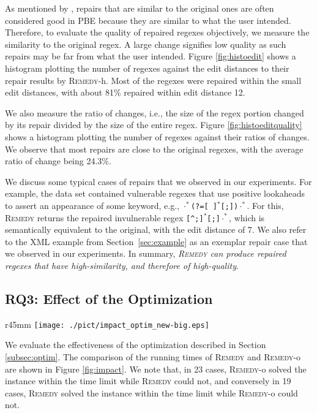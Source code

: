 \documentclass[conference]{IEEEtran}
\newcommand{\tool}{\textsc{Remedy}}
\newcommand{\any}{\cdot}
\newcommand{\tchanged}[2]{#2}
\begin{document}
As mentioned by \cite{10.1145/3360565}, repairs that are similar to the original ones are often considered good in PBE because they are similar to what the user intended.
Therefore, to evaluate the quality of repaired regexes objectively, we measure the similarity to the original regex.
A large change signifies low quality as such repairs may be far from what the user intended.
Figure \ref{fig:histoedit} shows a histogram plotting the number of regexes against the edit distances to their repair results by \tool{}-h. Most of the regexes were repaired within the small edit distances, with about 81\% repaired within edit distance 12.

We also measure the ratio of changes, i.e., the size of the regex portion changed by its repair divided by the size of the entire regex.  
Figure \ref{fig:histoeditquality} shows a histogram plotting the number of regexes against their ratios of changes.
We observe that most repairs are close to the original regexes, with the average ratio of change being 24.3\%.

\tchanged{}{
We discuss some typical cases of repairs that we observed in our experiments.  For example, the data set contained vulnerable regexes that use positive lookaheads to assert an appearance of some keyword, e.g., \texttt{$\any^*$(?=[ ]$^*$[;])$\any^*$}. For this, \tool{} returns the repaired invulnerable regex \texttt{[\textasciicircum;]$^*$[;]$\any^*$}, which is semantically equivalent to the original, with the edit distance of 7.  We also refer to the XML example from Section~\ref{sec:example} as an exemplar repair case that we observed in our experiments.}
In summary, \tchanged{{\em \tool{} can find high-quality regexes}}{{\em \tool{} can produce repaired regexes that have high-similarity, and therefore of high-quality}}.  




\subsection{RQ3: Effect of the Optimization}
\begin{wrapfigure}{r}{45mm}
\vspace{-1em}
\centering
\texttt{[image: ./pict/impact\_optim\_new-big.eps]}
     \caption{Optimization effect.}
    \label{fig:impact} 
\vspace{-0.5em}
\end{wrapfigure}
We evaluate the effectiveness of the optimization described in Section \ref{subsec:optim}.
The comparison of the running times of \tool{} and \tool{}-o are shown in Figure \ref{fig:impact}. 
We note that, in 23 cases, \tool{}-o solved the instance within the time limit while \tool{} could not, and
conversely in 19 cases, \tool{} solved the instance within the time limit while \tool{}-o could not.
\end{document}
